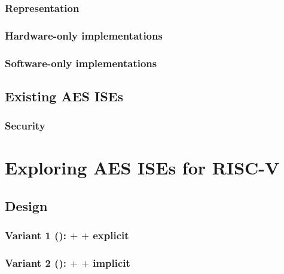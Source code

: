 \documentclass[preprint]{iacrtrans}
\begin{document}
\subsubsection{Representation}
\label{sec:bg:aes_impl_rep}


\subsubsection{Hardware-only implementations}
\label{sec:bg:aes_impl_hw}

\subsubsection{Software-only implementations}
\label{sec:bg:aes_impl_sw}

\subsection{Existing AES ISEs}
\label{sec:bg:aes_impl_ise}


\subsubsection{Security}
\label{sec:bg:aes_impl_sec}



\section{Exploring AES ISEs for RISC-V}
\label{sec:ise}


\subsection{Design}
\label{sec:ise:design}



\subsubsection{Variant 1 ():  $+$  $+$ explicit }
\label{sec:ise:design:v1}

\subsubsection{Variant 2 ():  $+$  $+$ implicit }
\label{sec:ise:design:v2}

\end{document}
